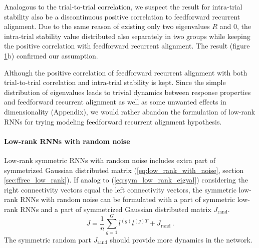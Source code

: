\documentclass[11pt]{article}
\begin{document}
\begin{figure}[H]
			\label{fig:ttc_its_low_rank_sym_no_noise}
		\end{figure}
	
	Analogous to the trial-to-trial correlation, we suspect the result for intra-trial stability also be a discontinuous positive correlation to feedforward recurrent alignment. Due to the same reason of existing only two eigenvalues $R$ and $0$, the intra-trial stability value distributed also separately in two groups while keeping the positive correlation with feedforward recurrent alignment. The result (figure \ref{fig:ttc_its_low_rank_sym_no_noise}b) confirmed our assumption. 
	
	 Although the positive correlation of feedforward recurrent alignment with both trial-to-trial correlation and intra-trial stability is kept. Since the simple distribution of eigenvalues leads to trivial dynamics between response properties and feedforward recurrent alignment as well as some unwanted effects in dimensionality (Appendix), %
	 we would rather abandon the formulation of low-rank RNNs for trying modeling feedforward recurrent alignment hypothesis. 
	
	\paragraph{Low-rank RNNs with random noise}
	Low-rank symmetric RNNs with random noise includes extra part of symmetrized Gaussian distributed matrix (\ref{eq:low_rank_with_noise}, section \ref{sec:ffrec_low_rank}). If analog to (\ref{eq:sym_low_rank_eigval}) considering the right connectivity vectors equal the left connectivity vectors, the symmetric low-rank RNNs with random noise can be formulated with a part of symmetric low-rank RNNs and a part of symmetrized Gaussian distributed matrix $J_{\text{rand}}$. 
		\begin{equation} \label{eq:low_rank_sym_with_noise}
			J = \frac{1}{n}\sum_{g =1}^{G} l^{(g)} l^{(g)T} + J_{\text{rand}} \, .
		\end{equation}
	The symmetric random part $J_{\text{rand}}$ should provide more dynamics in the network. 
	
\end{document}
